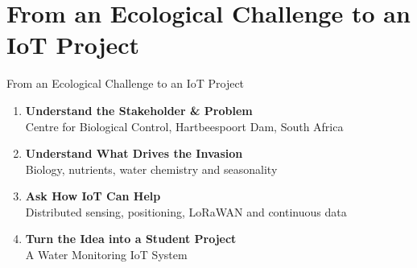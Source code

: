 \part[nopartpage]{From an Ecological Challenge to an IoT Project}

\begin{frame}{From an Ecological Challenge to an IoT Project}
\begin{enumerate}
    \item \textbf{Understand the Stakeholder \& Problem}\\
          Centre for Biological Control, Hartbeespoort Dam, South Africa
    \item \textbf{Understand What Drives the Invasion}\\
          Biology, nutrients, water chemistry and seasonality
    \item \textbf{Ask How IoT Can Help}\\
          Distributed sensing, positioning, LoRaWAN and continuous data
    \item \textbf{Turn the Idea into a Student Project}\\
          A Water Monitoring IoT System
\end{enumerate}
\end{frame}
